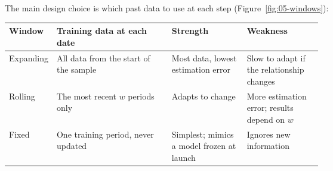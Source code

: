 The main design choice is which past data to use at each step (Figure~\ref{fig:05-windows}):

\begin{center}
\small
\begin{tabularx}{0.9\linewidth}{@{}>{\raggedright\arraybackslash}p{0.13\linewidth}>{\raggedright\arraybackslash}X>{\raggedright\arraybackslash}p{0.24\linewidth}>{\raggedright\arraybackslash}p{0.24\linewidth}@{}}
\toprule
Window & Training data at each date & Strength & Weakness \\
\midrule
Expanding & All data from the start of the sample & Most data, lowest estimation error & Slow to adapt if the relationship changes \\
Rolling & The most recent $w$ periods only & Adapts to change & More estimation error; results depend on $w$ \\
Fixed & One training period, never updated & Simplest; mimics a model frozen at launch & Ignores new information \\
\bottomrule
\end{tabularx}
\end{center}


